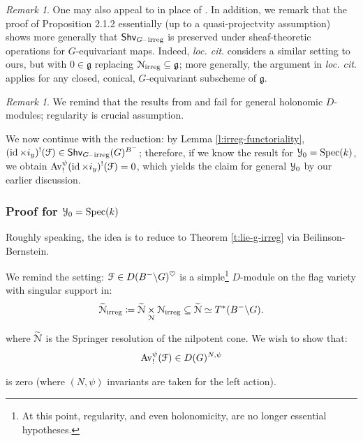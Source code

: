 \documentclass[reqno,11pt]{amsart}
\numberwithin{equation}{subsection}
\theoremstyle{remark}
\newtheorem{rem}[thm]{Remark}
\newcommand{\sF}{{\EuScript F}}
\newcommand{\sN}{{\EuScript N}}
\newcommand{\sY}{{\EuScript Y}}
\newcommand{\fg}{{\mathfrak g}}
\newcommand{\on}{\operatorname}
\newcommand{\mathendash}{\text{\textendash}}
\newcommand{\Spec}{\on{Spec}}
\newcommand{\id}{\on{id}}
\newcommand{\heart}{\heartsuit}
\newcommand{\Av}{\on{Av}}
\renewcommand{\subset}{\subseteq}
\newcommand{\Shv}{\mathsf{Shv}}
\newcommand{\irreg}{\on{irreg}}
\newcommand{\Girreg}{G\mathendash\irreg}
\begin{document}
\begin{rem}

One may also appeal to \cite{ginzburg-inventiones} in place 
of \cite{ks}. In addition, we remark that the proof of 
\cite{bellamy-ginzburg} Proposition 2.1.2 essentially 
(up to a quasi-projectvity assumption) shows more generally
that $\Shv_{\Girreg}$ is preserved under sheaf-theoretic operations 
for $G$-equivariant maps. Indeed, \emph{loc. cit}. considers
a similar setting to ours, but with $0 \in \fg$ replacing
$\sN_{\irreg} \subset \fg$; more generally, the argument in \emph{loc. cit}.
applies for any closed, conical, $G$-equivariant subscheme
of $\fg$.

\end{rem}

\begin{rem}

We remind that the results from \cite{ks} and \cite{ginzburg-inventiones} 
fail for general holonomic $D$-modules; regularity is crucial assumption.

\end{rem}

We now continue with the reduction: by Lemma \ref{l:irreg-functoriality},
$(\id\times i_y)^!(\sF) \in \Shv_{\Girreg}(G)^{B^-}$; therefore,
if we know the result for $\sY_0 = \Spec(k)$, we obtain
$\Av_!^{\psi}(\id\times i_y)^!(\sF) = 0$, which yields the claim for
general $\sY_0$ by our earlier discussion.

\subsubsection{Proof for $\sY_0 = \Spec(k)$}

Roughly speaking, the idea is to reduce to Theorem \ref{t:lie-g-irreg}
via Beilinson-Bernstein.

We remind the setting: $\sF \in D(B^-\backslash G)^{\heart}$ 
is a simple\footnote{At this point, 
regularity, and even holonomicity, are no longer essential hypotheses.}
$D$-module on the flag variety with singular support in:
%
\[
\widetilde{\sN}_{\irreg} \coloneq \widetilde{\sN} \underset{\sN}{\times} \sN_{\irreg}
\subset \widetilde{\sN} \simeq T^*(B^-\backslash G).
\]

\noindent where $\widetilde{\sN}$ is the Springer resolution of the
nilpotent cone. We wish to show that:
%
\[
\Av_!^{\psi}(\sF) \in D(G)^{N,\psi}
\]

\noindent is zero (where $(N,\psi)$ invariants are taken for the left action).
\end{document}
